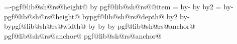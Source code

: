 {{                                    \pgf@lib@sh@rs@toptext%
                                \pgf@y=-\csname pgf@lib@sh@rs@height@\pgf@lib@sh@rs@number\endcsname\relax%
                                \advance\pgf@y by\pgf@lib@sh@rs@max@totalheight\relax%
                            \else%
                                \expandafter\ifx\csname pgf@lib@sh@rs@\pgf@lib@sh@rs@number @item\endcsname%
                                        \pgf@lib@sh@rs@basetext%
                                    \pgf@y=\pgf@lib@sh@rs@max@totalheight\relax%
                                    \advance\pgf@y by-\pgfutil@tempdima%
                                    \advance\pgf@y by\pgfutil@tempdimb%
                                    \divide\pgf@y by2\relax%
                                \else%
                                    \pgf@y=\pgf@lib@sh@rs@max@totalheight\relax%
                                    \advance\pgf@y by-\csname pgf@lib@sh@rs@height@\pgf@lib@sh@rs@number\endcsname\relax%
                                    \advance\pgf@y by\csname pgf@lib@sh@rs@depth@\pgf@lib@sh@rs@number\endcsname\relax%
                                    \divide\pgf@y by2\relax%
                                \fi%
                            \fi%
                        \fi%
                        \ifnum{}\relax%
                            \edef\pgf@lib@sh@rs@yoffset{\the\pgf@y}%
                            \pgf@y=0pt\relax%
                            \pgfextract@process\pgf@lib@sh@rs@anchor@one{}%
                            \addtosavedmacro\pgf@lib@sh@rs@anchor@one%
                            \let\pgf@lib@sh@rs@lastanchor=\pgf@lib@sh@rs@anchor@one%
                            \let\pgf@lib@sh@rs@lastnumber=\pgf@lib@sh@rs@number%
                        \else
                            \advance\pgf@y by-\pgf@lib@sh@rs@yoffset\relax%
                            \advance\pgf@x by\csname pgf@lib@sh@rs@width@\pgf@lib@sh@rs@lastnumber\endcsname\relax%
                            \advance\pgf@x by\innerxsep\relax%
                            \advance\pgf@x by\pgflinewidth%
                            \advance\pgf@x by\innerxsep\relax%
                            \expandafter\pgfextract@process\csname pgf@lib@sh@rs@anchor@\pgf@lib@sh@rs@number\endcsname{}%
                            \expandafter\let\expandafter\pgf@lib@sh@rs@lastanchor\expandafter=%
                                \csname pgf@lib@sh@rs@anchor@\pgf@lib@sh@rs@number\endcsname%
                            \let\pgf@lib@sh@rs@lastnumber=\pgf@lib@sh@rs@number%
                            \expandafter\addtosavedmacro\csname pgf@lib@sh@rs@anchor@\pgf@lib@sh@rs@number\endcsname%
}}
